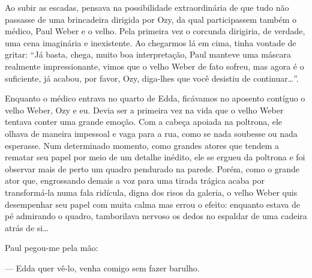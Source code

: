 


Ao subir as escadas, pensava na possibilidade extraordinária de que tudo não
passasse de uma brincadeira dirigida por Ozy, da qual participassem também o
médico, Paul Weber e o velho. Pela primeira vez o corcunda dirigiria, de
verdade, uma cena imaginária e inexistente. Ao chegarmos lá em cima, tinha
vontade de gritar: ``Já basta, chega, muito boa interpretação, Paul manteve
uma máscara realmente impressionante, vimos que o velho Weber de fato sofreu,
mas agora é o suficiente, já acabou, por favor, Ozy, diga-lhes que você
desistiu de continuar\ldots{}''.


Enquanto o médico entrava no quarto de Edda, ficávamos no aposento
 contíguo o velho Weber, Ozy e eu. Devia ser a primeira vez na vida que o
 velho Weber tentava conter uma grande emoção. Com a cabeça apoiada na
 poltrona, ele olhava de maneira impessoal e vaga para a rua, como se nada
 soubesse ou nada esperasse. Num determinado momento, como grandes atores que
 tendem a rematar seu papel por meio de um detalhe inédito, ele se ergueu da
 poltrona e foi observar mais de perto um quadro pendurado na parede. Porém,
 como o grande ator que, engrossando demais a voz para uma tirada trágica
 acaba por transformá-la numa fala ridícula, digna dos risos da galeria, o
 velho Weber quis desempenhar seu papel com muita calma mas errou o efeito:
 enquanto estava de pé admirando o quadro, tamborilava nervoso os dedos no
 espaldar de uma cadeira atrás de si\ldots{}

Paul pegou-me pela mão:

--- Edda quer vê-lo, venha comigo sem fazer barulho.


